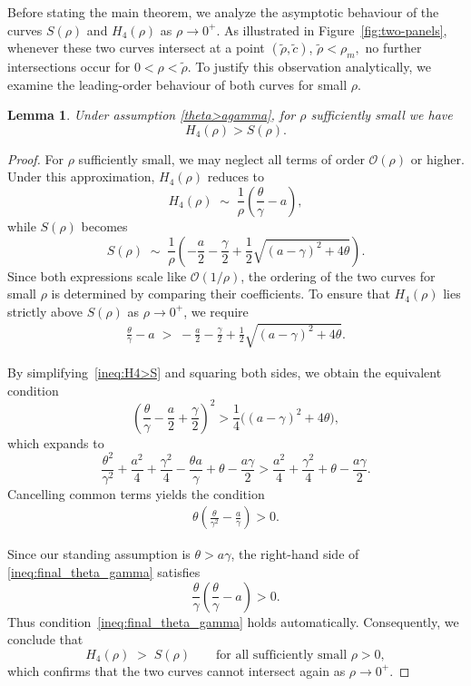 \documentclass[11pt]{article}
\newtheorem{lemma}[thm]{Lemma}
\theoremstyle{definition}
\begin{document}
Before stating the main theorem, we analyze the asymptotic behaviour of the curves 
\(S(\rho)\) and \(H_4(\rho)\) as \(\rho\to 0^+\). As illustrated in Figure~\ref{fig:two-panels},  
whenever these two curves intersect at a point \((\tilde\rho,\tilde c)\), $\tilde \rho<{\rho}_m, $ no further 
intersections occur for \(0<\rho<\tilde\rho\).  
To justify this observation analytically, we examine the leading-order behaviour of  
both curves for small \(\rho\).
\begin{lemma}\label{lem:asymptotic}
\label{lem:H4>S_near_zero}
Under assumption \eqref{theta>agamma}, for $\rho$ sufficiently small we have
\[
H_4(\rho) > S(\rho).
\]
\end{lemma}
\begin{proof}
For \(\rho\) sufficiently small, we may neglect all terms of order \(\mathcal{O}(\rho)\) or higher.  
Under this approximation, \(H_4(\rho)\) reduces to  
\[
    H_4(\rho)\;\sim\;\frac{1}{\rho}\left(\frac{\theta}{\gamma}-a\right),
\]
while \(S(\rho)\) becomes
\[
    S(\rho)\;\sim\;
    \frac{1}{\rho}\left(
        -\frac{a}{2}-\frac{\gamma}{2}
        +\frac{1}{2}\sqrt{(a-\gamma)^2+4\theta}
    \right).
\]
Since both expressions scale like \(\mathcal{O}(1/\rho)\), the ordering of the two curves  
for small \(\rho\) is determined by comparing their coefficients.  
To ensure that \(H_4(\rho)\) lies strictly above \(S(\rho)\) as \(\rho\to 0^+\), we require
\begin{align}\label{ineq:H4>S}
    \frac{\theta}{\gamma}-a
    \;>\;
    -\frac{a}{2}-\frac{\gamma}{2}
    +\frac{1}{2}\sqrt{(a-\gamma)^2+4\theta}.
\end{align}

By simplifying~\eqref{ineq:H4>S} and squaring both sides, we obtain the equivalent condition
\[
    \left(\frac{\theta}{\gamma}-\frac{a}{2}+\frac{\gamma}{2}\right)^{2}
    >
    \frac{1}{4}\Big((a-\gamma)^{2}+4\theta\Big),
\]
which expands to
\[
    \frac{\theta^{2}}{\gamma^{2}}
    +\frac{a^{2}}{4}
    +\frac{\gamma^{2}}{4}
    -\frac{\theta a}{\gamma}
    +\theta
    -\frac{a\gamma}{2}
    >
    \frac{a^{2}}{4}
    +\frac{\gamma^{2}}{4}
    +\theta
    -\frac{a\gamma}{2}.
\]
Cancelling common terms yields the condition
\begin{align}\label{ineq:final_theta_gamma}
    \theta\left(\frac{\theta}{\gamma^{2}}-\frac{a}{\gamma}\right)>0.
\end{align}

Since our standing assumption is \(\theta>a\gamma\), the right-hand side of 
\eqref{ineq:final_theta_gamma} satisfies
\[
    \dfrac{\theta}{\gamma}\left(\frac{\theta}{\gamma}-{a}\right)
    >
     0.
\]
Thus condition~\eqref{ineq:final_theta_gamma} holds automatically.  
Consequently, we conclude that
\[
    H_4(\rho)\;>\;S(\rho)\qquad \text{for all sufficiently small } \rho>0,
\]
which confirms that the two curves cannot intersect again as \(\rho\to 0^+\).

\end{proof}
\end{document}
